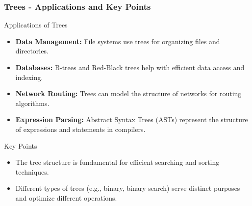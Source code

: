 \documentclass{beamer}
\begin{document}
\begin{frame}[fragile]
    \frametitle{Trees - Applications and Key Points}
    \begin{block}{Applications of Trees}
        \begin{itemize}
            \item \textbf{Data Management:} File systems use trees for organizing files and directories.
            \item \textbf{Databases:} B-trees and Red-Black trees help with efficient data access and indexing.
            \item \textbf{Network Routing:} Trees can model the structure of networks for routing algorithms.
            \item \textbf{Expression Parsing:} Abstract Syntax Trees (ASTs) represent the structure of expressions and statements in compilers.
        \end{itemize}
    \end{block}
    
    \begin{block}{Key Points}
        \begin{itemize}
            \item The tree structure is fundamental for efficient searching and sorting techniques.
            \item Different types of trees (e.g., binary, binary search) serve distinct purposes and optimize different operations.
        \end{itemize}
    \end{block}
\end{frame}
\end{document}
